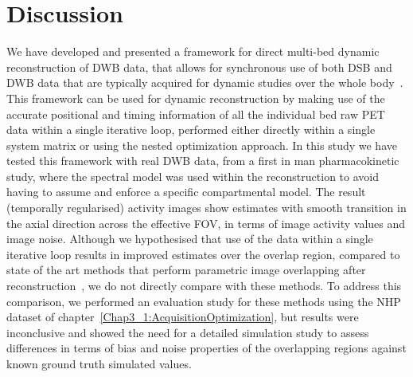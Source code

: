 %


\section{Discussion}

We have developed and presented a framework for direct multi-bed dynamic reconstruction of DWB data, that allows for synchronous use of both DSB and DWB data that are typically acquired for dynamic studies over the whole body~\cite{Karakatsanis2013}. 
This framework can be used for dynamic reconstruction by making use of the accurate positional and timing information of all the individual bed raw PET data within a single iterative loop, performed either directly within a single system matrix or using the nested optimization approach.
In this study we have tested this framework with real DWB data, from a first in man pharmacokinetic study, where the spectral model was used within the reconstruction to avoid having to assume and enforce a specific compartmental model.
The result (temporally regularised) activity images show estimates with smooth transition in the axial direction across the effective FOV, in terms of image activity values and image noise. Although we hypothesised that use of the data within a single iterative loop results in improved estimates over the overlap region, compared to state of the art methods that perform parametric image overlapping  after reconstruction~\cite{Karakatsanis2016a,Hu2020}, we do not directly compare with these methods. To address this comparison, we performed an evaluation study for these methods using the NHP dataset of chapter~\ref{Chap3_1:AcquisitionOptimization}, but results were inconclusive and showed the need for a detailed simulation study to assess differences in terms of bias and noise properties of the overlapping regions against known ground truth simulated values. 

